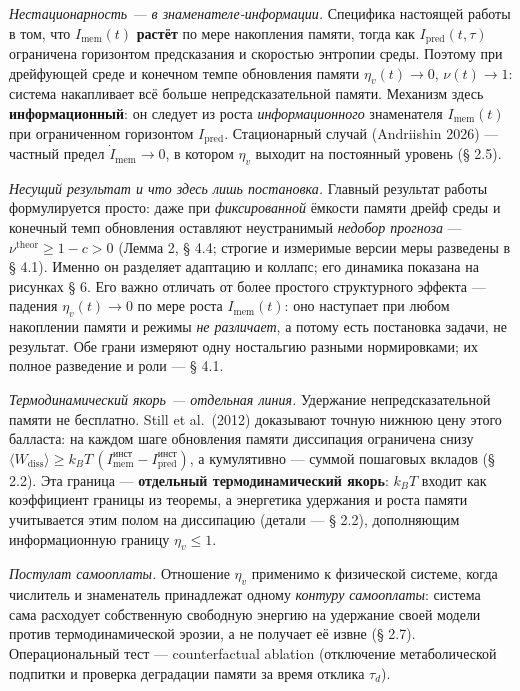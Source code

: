 \documentclass[pdflatex,sn-mathphys-ay]{sn-jnl}
\begin{document}
\emph{Нестационарность --- в знаменателе-информации.} Специфика настоящей работы в том, что \(I_{\text{mem}}(t)\) \textbf{растёт} по мере накопления памяти, тогда как \(I_{\text{pred}}(t,\tau)\) ограничена горизонтом предсказания и скоростью энтропии среды. Поэтому при дрейфующей среде и конечном темпе обновления памяти \(\eta_v(t) \to 0\), \(\nu(t) \to 1\): система накапливает всё больше непредсказательной памяти. Механизм здесь \textbf{информационный}: он следует из роста \emph{информационного} знаменателя \(I_{\text{mem}}(t)\) при ограниченном горизонтом \(I_{\text{pred}}\). Стационарный случай (Andriishin 2026) --- частный предел \(\dot I_{\text{mem}} \to 0\), в котором \(\eta_v\) выходит на постоянный уровень (§ 2.5).



\emph{Несущий результат и что здесь лишь постановка.} Главный результат работы формулируется просто: даже при \emph{фиксированной} ёмкости памяти дрейф среды и конечный темп обновления оставляют неустранимый \emph{недобор прогноза} --- \(\nu^{\text{theor}} \ge 1 - c > 0\) (Лемма 2, § 4.4; строгие и измеримые версии меры разведены в § 4.1). Именно он разделяет адаптацию и коллапс; его динамика показана на рисунках § 6. Его важно отличать от более простого структурного эффекта --- падения \(\eta_v(t) \to 0\) по мере роста \(I_{\text{mem}}(t)\): оно наступает при любом накоплении памяти и режимы \emph{не различает}, а потому есть постановка задачи, не результат. Обе грани измеряют одну ностальгию разными нормировками; их полное разведение и роли --- § 4.1.



\emph{Термодинамический якорь --- отдельная линия.} Удержание непредсказательной памяти не бесплатно. Still et al.~(2012) доказывают точную нижнюю цену этого балласта: на каждом шаге обновления памяти диссипация ограничена снизу \(\langle W_{\text{diss}}\rangle \ge k_B T\,(I_{\text{mem}}^{\text{инст}} - I_{\text{pred}}^{\text{инст}})\), а кумулятивно --- суммой пошаговых вкладов (§ 2.2). Эта граница --- \textbf{отдельный термодинамический якорь}: \(k_B T\) входит как коэффициент границы из теоремы, а энергетика удержания и роста памяти учитывается этим полом на диссипацию (детали --- § 2.2), дополняющим информационную границу \(\eta_v \le 1\).



\emph{Постулат самооплаты.} Отношение \(\eta_v\) применимо к физической системе, когда числитель и знаменатель принадлежат одному \emph{контуру самооплаты}: система сама расходует собственную свободную энергию на удержание своей модели против термодинамической эрозии, а не получает её извне (§ 2.7). Операциональный тест --- counterfactual ablation (отключение метаболической подпитки и проверка деградации памяти за время отклика \(\tau_d\)).
\end{document}
